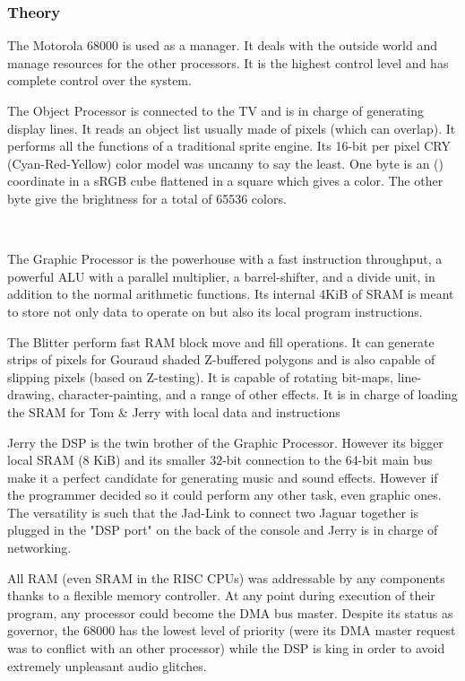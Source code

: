\subsubsection{Theory}
\par
The Motorola 68000 is used as a manager. It deals with the outside world and manage resources for the other processors. It is the highest control level and has complete control over the system.\\
\par
The Object Processor is connected to the TV and is in charge of generating display lines. It reads an object list usually made of pixels (which can overlap). It performs all the functions of a traditional sprite engine. Its 16-bit per pixel CRY (Cyan-Red-Yellow) color model was uncanny to say the least. One byte is an () coordinate in a sRGB cube flattened in a square which gives a color. The other byte give the brightness for a total of 65536 colors.\\
\par
{}\\
\par

\par
The Graphic Processor is the powerhouse with a fast instruction throughput, a powerful ALU with a
parallel multiplier, a barrel-shifter, and a divide unit, in addition to the normal arithmetic functions. Its internal 4KiB of SRAM is meant to store not only data to operate on but also its local program instructions.\\
\par
The Blitter perform fast RAM block move and fill operations. It can generate strips of pixels for Gouraud shaded Z-buffered polygons and is also capable of slipping pixels (based on Z-testing). It
is capable of rotating bit-maps, line-drawing, character-painting, and a range of other effects. It is in charge of loading the SRAM for Tom \& Jerry with local data and instructions\\
\par
Jerry the DSP is the twin brother of the Graphic Processor. However its bigger local SRAM (8 KiB) and its smaller 32-bit connection to the 64-bit main bus make it a perfect candidate for generating music and sound effects. However if the programmer decided so it could perform any other task, even graphic ones. The versatility is such that the Jad-Link to connect two Jaguar together is plugged in the "DSP port" on the back of the console and Jerry is in charge of networking.\\
\par
All RAM (even SRAM in the RISC CPUs) was addressable by any components thanks to a flexible memory controller. At any point during execution of their program, any processor could become the DMA bus master. Despite its status as governor, the 68000 has the lowest level of priority (were its DMA master request was to conflict with an other processor) while the DSP is king in order to avoid extremely unpleasant audio glitches.
\par



